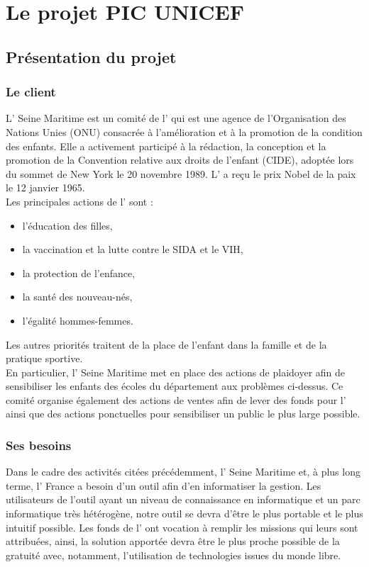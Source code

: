 \documentclass[asi]{picInsa}
\begin{document}
\chapter{Le projet PIC UNICEF}
\label{le_projet}

\section{Présentation du projet}
\subsection*{Le client}
L'\nomClient{} Seine Maritime est un comité de l'\nomClient{} qui est une agence de l'Organisation des Nations Unies (ONU) consacrée à l'amélioration et à la promotion de la condition des enfants. Elle a activement participé à la rédaction, la conception et la promotion de la Convention relative aux droits de l'enfant (CIDE), adoptée lors du sommet de New York le 20 novembre 1989. L'\nomClient{} a reçu le prix Nobel de la paix le 12 janvier 1965. \\
Les principales actions de l'\nomClient{} sont : \begin{itemize}
\item l'éducation des filles,
\item la vaccination et la lutte contre le SIDA et le VIH,
\item la protection de l'enfance,
\item la santé des nouveau-nés,
\item l'égalité hommes-femmes.
\end{itemize}
Les autres priorités traitent de la place de l'enfant dans la famille et de la pratique sportive.\\
En particulier, l'\nomClient{} Seine Maritime met en place des actions de plaidoyer afin de sensibiliser les enfants des écoles du département aux problèmes ci-dessus. Ce comité organise également des actions de ventes afin de lever des fonds pour l'\nomClient{} ainsi que des actions ponctuelles pour sensibiliser un public le plus large possible.

\subsection*{Ses besoins}
Dans le cadre des activités citées précédemment, l'\nomClient{} Seine Maritime et, à plus long terme, l'\nomClient{} France a besoin d'un outil afin d'en informatiser la gestion. Les utilisateurs de l'outil ayant un niveau de connaissance en informatique et un parc informatique très hétérogène, notre outil se devra d'être le plus portable et le plus intuitif possible. Les fonds de l'\nomClient{} ont vocation à remplir les missions qui leurs sont attribuées, ainsi, la solution apportée devra être le plus proche possible de la gratuité avec, notamment, l'utilisation de technologies issues du monde libre. \newpage
\end{document}
